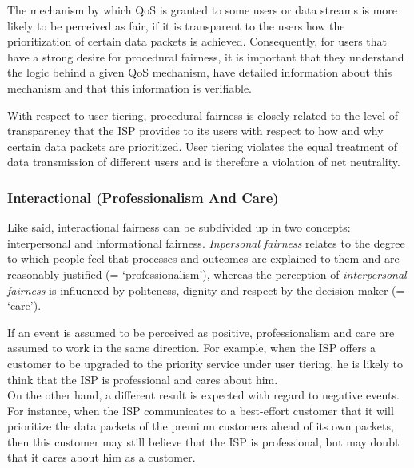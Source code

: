 The mechanism by which \ac{QoS} is granted to some users or data streams is more likely to be perceived as fair, if it is transparent to the users how the prioritization of certain data packets is achieved. Consequently, for users that have a strong desire for procedural fairness, it is important that they understand the logic behind a given \ac{QoS} mechanism, have detailed information about this mechanism and that this information is verifiable.

With respect to user tiering, procedural fairness is closely related to the level of transparency that the \ac{ISP} provides to its users with respect to how and why certain data packets are prioritized. User tiering violates the equal treatment of data transmission of different users and is therefore a violation of net neutrality.

\subsubsection{Interactional (Professionalism And Care)}
Like said, interactional fairness can be subdivided up in two concepts: interpersonal and informational fairness. \emph{Inpersonal fairness} relates to the degree to which people feel that processes and outcomes are explained to them and are reasonably justified (= `professionalism'), whereas the perception of \emph{interpersonal fairness} is influenced by politeness, dignity and respect by the decision maker (= `care').

If an event is assumed to be perceived as positive, professionalism and care are assumed to work in the same direction. For example, when the \ac{ISP} offers a customer to be upgraded to the priority service under user tiering, he is likely to think that the \ac{ISP} is professional and cares about him.\\
On the other hand, a different result is expected with regard to negative events. For instance, when the \ac{ISP} communicates to a best-effort customer that it will prioritize the data packets of the premium customers ahead of its own packets, then this customer may still believe that the \ac{ISP} is professional, but may doubt that it cares about him as a customer.